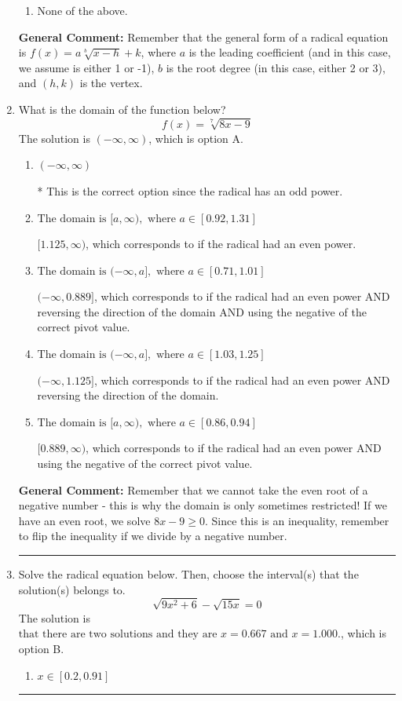 \documentclass{extbook}[14pt]
\newcommand{\litem}[1]{\item #1

\rule{\textwidth}{0.4pt}}
\begin{document}
\begin{enumerate}
{\begin{enumerate}[label=\Alph*.]
\begin{multicols}{2}
\end{multicols}\item None of the above.\end{enumerate}
\textbf{General Comment:} Remember that the general form of a radical equation is $ f(x) = a \sqrt[b]{x - h} + k $, where $a$ is the leading coefficient (and in this case, we assume is either 1 or -1), $b$ is the root degree (in this case, either 2 or 3), and $(h, k)$ is the vertex.
}
\litem{
What is the domain of the function below?
\[ f(x) = \sqrt[7]{8 x - 9} \]The solution is \( (-\infty, \infty) \), which is option A.\begin{enumerate}[label=\Alph*.]
\item \( (-\infty, \infty) \)

* This is the correct option since the radical has an odd power.
\item \( \text{The domain is } [a, \infty), \text{   where } a \in [0.92, 1.31] \)

$[1.125, \infty)$, which corresponds to if the radical had an even power.
\item \( \text{The domain is } (-\infty, a], \text{   where } a \in [0.71, 1.01] \)

$(-\infty, 0.889]$, which corresponds to if the radical had an even power AND reversing the direction of the domain AND using the negative of the correct pivot value.
\item \( \text{The domain is } (-\infty, a], \text{   where } a \in [1.03, 1.25] \)

$(-\infty, 1.125]$, which corresponds to if the radical had an even power AND reversing the direction of the domain.
\item \( \text{The domain is } [a, \infty), \text{   where } a \in [0.86, 0.94] \)

$[0.889, \infty)$, which corresponds to if the radical had an even power AND using the negative of the correct pivot value.
\end{enumerate}

\textbf{General Comment:} Remember that we cannot take the even root of a negative number - this is why the domain is only sometimes restricted! If we have an even root, we solve $8 x - 9 \geq 0$. Since this is an inequality, remember to flip the inequality if we divide by a negative number.
}
\litem{
Solve the radical equation below. Then, choose the interval(s) that the solution(s) belongs to.
\[ \sqrt{9 x^2 + 6} - \sqrt{15 x} = 0 \]The solution is \( \text{that there are two solutions and they are } x = 0.667 \text{ and } x = 1.000. \), which is option B.\begin{enumerate}[label=\Alph*.]
\item \( x \in [0.2,0.91] \)


\end{enumerate}}
\end{enumerate}
\end{document}
